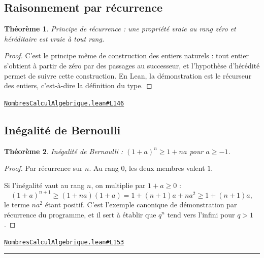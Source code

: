 \documentclass[11pt,a4paper]{article}
\theoremstyle{definition}
\theoremstyle{plain}
\newtheorem{theoreme}{Théorème}
\newcommand{\source}[2]{\par\smallskip\noindent\hfill{\footnotesize\href{#1}{\texttt{#2}}}\par\smallskip}
\begin{document}
\subsection{Raisonnement par récurrence}

\begin{theoreme}
Principe de récurrence : une propriété vraie au rang zéro et héréditaire est vraie à
tout rang.
\end{theoreme}

\begin{proof}
C'est le principe même de construction des entiers naturels : tout entier s'obtient à
partir de zéro par des passages au successeur, et l'hypothèse d'hérédité permet de suivre
cette construction. En Lean, la démonstration est le récurseur des entiers, c'est-à-dire
la définition du type.
\end{proof}
\source{https://github.com/Commutator-IO/learn-lean/blob/main/cours/02-lycee/01-nombres-calcul-algebrique/NombresCalculAlgebrique.lean\#L146}{NombresCalculAlgebrique.lean\#L146}

\subsection{Inégalité de Bernoulli}

\begin{theoreme}
Inégalité de Bernoulli : $(1 + a)^n \ge 1 + na$ pour $a \ge -1$.
\end{theoreme}

\begin{proof}
Par récurrence sur $n$. Au rang $0$, les deux membres valent $1$.

Si l'inégalité vaut au rang $n$, on multiplie par $1 + a \ge 0$ :
\[ (1+a)^{n+1} \ge (1 + na)(1 + a) = 1 + (n+1)a + na^2 \ge 1 + (n+1)a , \]
le terme $na^2$ étant positif. C'est l'exemple canonique de démonstration par récurrence
du programme, et il sert à établir que $q^n$ tend vers l'infini pour $q > 1$.
\end{proof}
\source{https://github.com/Commutator-IO/learn-lean/blob/main/cours/02-lycee/01-nombres-calcul-algebrique/NombresCalculAlgebrique.lean\#L153}{NombresCalculAlgebrique.lean\#L153}

\vfill
\noindent\rule{0.35\linewidth}{0.4pt}\par
{}
\end{document}
